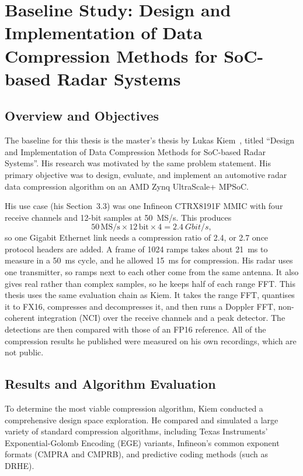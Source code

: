 \chapter{Baseline Study: Design and Implementation of Data Compression Methods for SoC-based Radar Systems}
\label{ch:kiem}

\section{Overview and Objectives}
\label{sec:kc_problem}
The baseline for this thesis is the master's thesis by Lukas Kiem~\cite{kiem2025}, titled ``Design and Implementation of Data Compression Methods for SoC-based Radar Systems''. His research was motivated by the same problem statement. His primary objective was to design, evaluate, and implement an automotive radar data compression algorithm on an AMD Zynq UltraScale+ MPSoC.

His use case (his Section~3.3) was one Infineon CTRX8191F MMIC with four
receive channels and 12-bit samples at \SI{50}{MS/s}. This produces
\begin{equation}
\label{eq:kc_rate}
50\,\mathrm{MS/s} \times 12\,\mathrm{bit} \times 4 = \SI{2.4}{Gbit/s},
\end{equation}
so one Gigabit Ethernet link needs a compression ratio of 2.4, or 2.7 once
protocol headers are added. A frame of 1024 ramps takes about
\SI{21}{\milli\second} to measure in a \SI{50}{\milli\second} cycle, and he
allowed \SI{15}{\milli\second} for compression. His radar uses one
transmitter, so ramps next to each other come from the same antenna. It also
gives real rather than complex samples, so he keeps half of each range FFT.
This thesis uses the same evaluation chain as Kiem. It takes the range FFT,
quantises it to FX16, compresses and decompresses it, and then runs a Doppler
FFT, non-coherent integration (NCI) over the receive channels and a peak
detector. The detections are then compared with those of an FP16 reference.
All of the compression results he published were measured on his own
recordings, which are not public.

\section{Results and Algorithm Evaluation}
\label{sec:kc_dse}
To determine the most viable compression algorithm, Kiem conducted a comprehensive design space exploration. He compared and simulated a large variety of standard compression algorithms, including Texas Instruments' Exponential-Golomb Encoding (EGE) variants, Infineon's common exponent formats (CMPRA and CMPRB), and predictive coding methods (such as DRHE).

